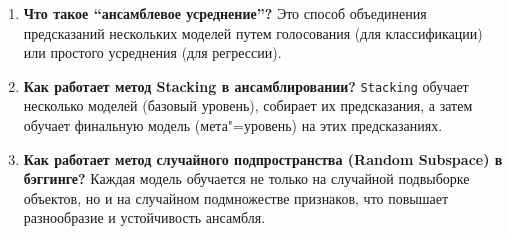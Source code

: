 \documentclass{article}
\begin{document}
\begin{enumerate}
    \item \textbf{Что такое ``ансамблевое усреднение''?} Это способ объединения предсказаний нескольких моделей путем голосования (для классификации) или простого усреднения (для регрессии).
    \item \textbf{Как работает метод Stacking в ансамблировании?} \texttt{Stacking} обучает несколько моделей (базовый уровень), собирает их предсказания, а затем обучает финальную модель (мета"=уровень) на этих предсказаниях.
    \item \textbf{Как работает метод случайного подпространства (Random Subspace) в бэггинге?} Каждая модель обучается не только на случайной подвыборке объектов, но и на случайном подмножестве признаков, что повышает разнообразие и устойчивость ансамбля.
\end{enumerate}
\end{document}
